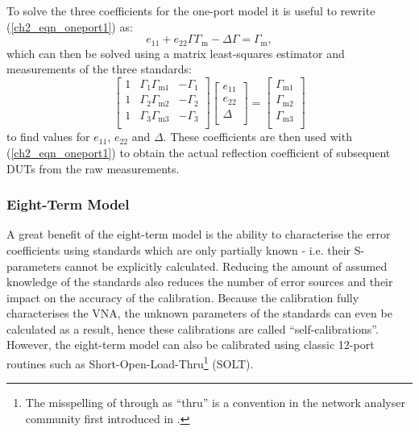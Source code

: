 \documentclass[../thesis/thesis.tex]{subfiles}
\begin{document}
To solve the three coefficients for the one-port model it is useful to rewrite (\ref{ch2_eqn_oneport1}) as: 
\begin{equation}
	e_{11}+e_{22}\Gamma\Gamma_{\textrm{m}}-\Delta\Gamma = \Gamma_{\textrm{m}},
\end{equation}
which can then be solved using a matrix least-squares estimator and measurements of the three standards:
\begin{equation}
	\begin{bmatrix}
		1 & \Gamma_1\Gamma_{\textrm{m}1} & -\Gamma_1 \\
		1 & \Gamma_2\Gamma_{\textrm{m}2} & -\Gamma_2 \\
		1 & \Gamma_3\Gamma_{\textrm{m}3} & -\Gamma_3 \\
	\end{bmatrix}
	\begin{bmatrix}
		e_{11} \\
		e_{22} \\
		\Delta \\
	\end{bmatrix}
	=
	\begin{bmatrix}
		\Gamma_{\textrm{m}1} \\
		\Gamma_{\textrm{m}2} \\
		\Gamma_{\textrm{m}3} \\
	\end{bmatrix}
\end{equation}
to find values for $e_{11}$, $e_{22}$ and $\Delta$. These coefficients are then used with (\ref{ch2_eqn_oneport1}) to obtain the actual reflection coefficient of subsequent DUTs from the raw measurements.

\subsubsection{Eight-Term Model}

A great benefit of the eight-term model is the ability to characterise the error coefficients using standards which are only partially known - i.e. their S-parameters cannot be explicitly calculated. Reducing the amount of assumed knowledge of the standards also reduces the number of error sources and their impact on the accuracy of the calibration. Because the calibration fully characterises the VNA, the unknown parameters of the standards can even be calculated as a result, hence these calibrations are called ``self-calibrations''. However, the eight-term model can also be calibrated using classic 12-port routines such as Short-Open-Load-Thru\footnote{The misspelling of through as ``thru'' is a convention in the network analyser community first introduced in \cite{Engen_1979}.} (SOLT).
\end{document}
